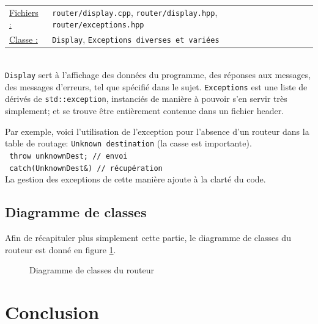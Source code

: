 \documentclass[a4paper,11pt]{article}
\begin{document}
\begin{tabularx}{\linewidth}{lX}
\underline{Fichiers :} & \texttt{router/display.cpp}, \texttt{router/display.hpp}, \texttt{router/exceptions.hpp}\\
\underline{Classe :} & \texttt{Display}, \texttt{Exceptions diverses et variées}\\
\end{tabularx}\\

\texttt{Display} sert à l'affichage des données du programme, des réponses aux messages, des messages d'erreurs, tel que spécifié dans le sujet.
\texttt{Exceptions} est une liste de dérivés de \texttt{std::exception}, instanciés de manière à pouvoir s'en servir très simplement; et se trouve être entièrement contenue dans un fichier header.

Par exemple, voici l'utilisation de l'exception pour l'absence d'un routeur dans la table de routage: \texttt{Unknown destination} (la casse est importante).
\\
\verb[ throw unknownDest; // envoi [\\
\verb[ catch(UnknownDest&) // récupération [\\
La gestion des exceptions de cette manière ajoute à la clarté du code.

\subsection{Diagramme de classes}

Afin de récapituler plus simplement cette partie, le diagramme de classes du routeur est donné en figure \ref{diagclasses}.

\begin{figure}[H]
\begin{center}
\caption{Diagramme de classes du routeur}
\label{diagclasses}
\end{center}
\end{figure}
\section*{Conclusion} %

\end{document}
